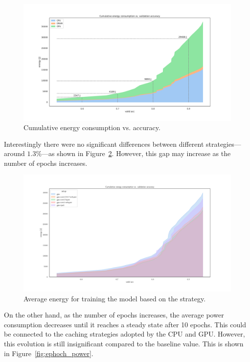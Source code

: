 \begin{figure}
    \centering
    \includegraphics[width=1.1\textwidth]{imgs/cumulative_energy_vs_accuracy}
    \caption{Cumulative energy consumption vs. accuracy.}
    \label{fig:cum_energy_vs_accuracy}
\end{figure}

Interestingly there were no significant differences between different strategies---around $1.3\%$---as shown in Figure~\ref{fig:av_energy_setup}.
However, this gap may increase as the number of epochs increases.

\begin{figure}
    \centering
    \includegraphics[width=1.1\textwidth]{imgs/cumulative_energy_fast10.pdf}
    \caption{Average energy for training the model based on the strategy.}
    \label{fig:av_energy_setup}
\end{figure}

On the other hand, as the number of epochs increases, the average power consumption decreases until it reaches a steady state after 10 epochs.
This could be connected to the caching strategies adopted by the CPU and GPU.
However, this evolution is still insignificant compared to the baseline value.
This is shown in Figure~\ref{fig:ephoch_power}.

